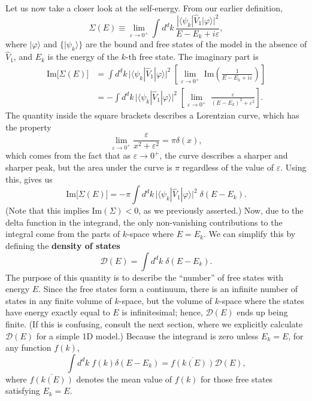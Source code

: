 \documentclass[pra,12pt]{revtex4}
\begin{document}
Let us now take a closer look at the self-energy.  From our earlier
definition,
$$\Sigma(E) \equiv \lim_{\varepsilon\rightarrow0^+} \int d^dk\, \frac{\displaystyle| \langle\psi_k| \hat{V}_1|\varphi\rangle|^2}{\displaystyle E-E_k+i\varepsilon},$$
where $|\varphi\rangle$ and $\{|\psi_k\rangle\}$ are the bound and
free states of the model in the absence of $\hat{V}_1$, and $E_k$ is
the energy of the $k$-th free state.  The imaginary part is
$$\begin{aligned}\mathrm{Im}\big[\Sigma(E)\big] &= \int d^dk\, \Big| \langle\psi_k| \hat{V}_1|\varphi\rangle\Big|^2 \; \left[ \lim_{\varepsilon\rightarrow0^+} \; \mathrm{Im}\left( \frac{1}{\displaystyle E-E_k+i\varepsilon}\right) \right] \\ &= - \int d^dk\, \Big| \langle\psi_k| \hat{V}_1|\varphi\rangle\Big|^2 \; \left[ \lim_{\varepsilon\rightarrow0^+} \; \frac{\varepsilon}{\displaystyle (E-E_k)^2 + \varepsilon^2}\right].\end{aligned}$$
The quantity inside the square brackets describes a Lorentzian curve,
which has the property
$$\lim_{\varepsilon\rightarrow 0^+} \frac{\varepsilon}{x^2+\varepsilon^2} = \pi\delta(x),$$
which comes from the fact that as $\varepsilon\rightarrow0^+$, the
curve describes a sharper and sharper peak, but the area under the
curve is $\pi$ regardless of the value of $\varepsilon$.  Using this,
gives us
$$\mathrm{Im}\big[\Sigma(E)\big] = - \pi \int d^dk\, \Big| \langle\psi_k| \hat{V}_1|\varphi\rangle\Big|^2 \; \delta(E-E_k).$$
(Note that this implies $\mathrm{Im}(\Sigma) < 0$, as we previously
asserted.)  Now, due to the delta function in the integrand, the only
non-vanishing contributions to the integral come from the parts of
$k$-space where $E = E_k$.  We can simplify this by defining the
\textbf{density of states}
$$\mathcal{D}(E) = \int d^d k\; \delta(E - E_k).$$
The purpose of this quantity is to describe the ``number'' of free
states with energy $E$.  Since the free states form a continuum, there
is an infinite number of states in any finite volume of $k$-space, but
the volume of $k$-space where the states have energy exactly equal to
$E$ is infinitesimal; hence, $\mathcal{D}(E)$ ends up being finite.
(If this is confusing, consult the next section, where we explicitly
calculate $\mathcal{D}(E)$ for a simple 1D model.)  Because the
integrand is zero unless $E_k = E$, for any function $f(k)$,
$$\int d^d k\; f(k) \delta(E - E_k) = \overline{f(k(E))} \mathcal{D}(E),$$
where $\overline{f(k(E))}$ denotes the mean value of $f(k)$ for those
free states satisfying $E_k = E$.
\end{document}
